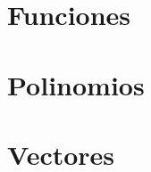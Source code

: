 \documentclass[12pt]{article}
\begin{document}
\tableofcontents










\section{Funciones}




\section{Polinomios}




\section{Vectores}

\end{document}
